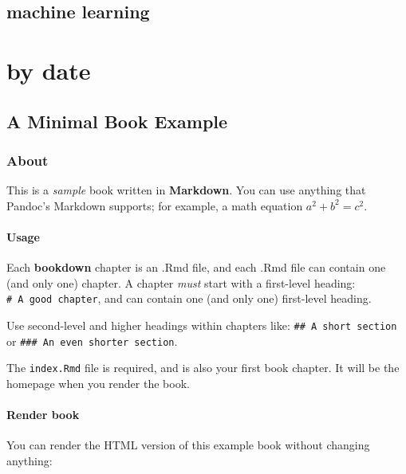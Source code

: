 \documentclass[
]{book}
\theoremstyle{definition}
\theoremstyle{definition}
\theoremstyle{definition}
\theoremstyle{definition}
\theoremstyle{remark}
\begin{document}
\hypertarget{machine-learning}{%
\chapter{machine learning}\label{machine-learning}}

\hypertarget{part-by-date}{%
\part{by date}\label{part-by-date}}

\hypertarget{a-minimal-book-example}{%
\chapter{A Minimal Book Example}\label{a-minimal-book-example}}

\hypertarget{about}{%
\section{About}\label{about}}

This is a \emph{sample} book written in \textbf{Markdown}. You can use anything that Pandoc's Markdown supports; for example, a math equation \(a^2 + b^2 = c^2\).

\hypertarget{usage}{%
\subsection{Usage}\label{usage}}

Each \textbf{bookdown} chapter is an .Rmd file, and each .Rmd file can contain one (and only one) chapter. A chapter \emph{must} start with a first-level heading: \texttt{\#\ A\ good\ chapter}, and can contain one (and only one) first-level heading.

Use second-level and higher headings within chapters like: \texttt{\#\#\ A\ short\ section} or \texttt{\#\#\#\ An\ even\ shorter\ section}.

The \texttt{index.Rmd} file is required, and is also your first book chapter. It will be the homepage when you render the book.

\hypertarget{render-book}{%
\subsection{Render book}\label{render-book}}

You can render the HTML version of this example book without changing anything:
\end{document}

